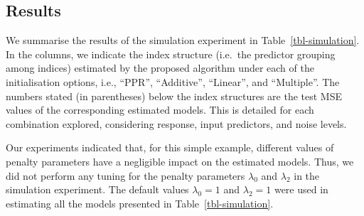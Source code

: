 \documentclass[
  11pt,
  a4paper,
]{article}
\begin{document}
\subsection{Results}\label{sec-sim-results}

We summarise the results of the simulation experiment in
Table~\ref{tbl-simulation}. In the columns, we indicate the index
structure (i.e.~the predictor grouping among indices) estimated by the
proposed algorithm under each of the initialisation options, i.e.,
``PPR'', ``Additive'', ``Linear'', and ``Multiple''. The numbers stated
(in parentheses) below the index structures are the test MSE values of
the corresponding estimated models. This is detailed for each
combination explored, considering response, input predictors, and noise
levels.

Our experiments indicated that, for this simple example, different
values of penalty parameters have a negligible impact on the estimated
models. Thus, we did not perform any tuning for the penalty parameters
\(\lambda_{0}\) and \(\lambda_{2}\) in the simulation experiment. The
default values \(\lambda_{0} = 1\) and \(\lambda_{2} = 1\) were used in
estimating all the models presented in Table~\ref{tbl-simulation}.
\end{document}
